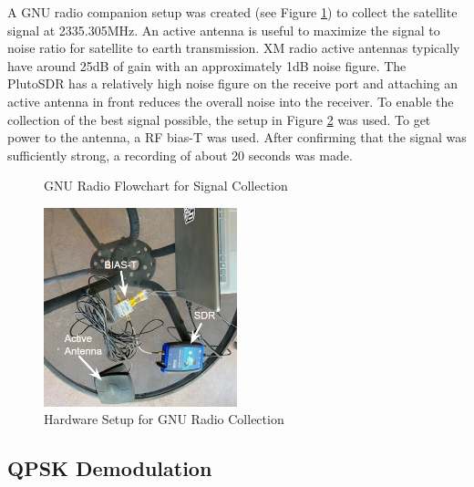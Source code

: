 \documentclass[conference,onecolumn]{IEEEtran}
\begin{document}
A GNU radio companion setup was created (see Figure \ref{fig::gnu_collect}) to collect the satellite signal at 2335.305MHz.  An active antenna is useful to maximize the signal to noise ratio for satellite to earth transmission.  XM radio active antennas typically have around 25dB of gain with an approximately 1dB  noise figure.  The PlutoSDR has a relatively high noise figure on the receive port and attaching an active antenna in front reduces the overall noise into the receiver.  To enable the collection of the best signal possible, the setup in Figure \ref{fig::gnu_hardware} was used.  To get power to the antenna, a RF bias-T was used.  After confirming that the signal was sufficiently strong, a recording of about 20 seconds was made.
\begin{figure}[H]
	\centerline{}
	\caption{GNU Radio Flowchart for Signal Collection}
	\label{fig::gnu_collect}
\end{figure}
\begin{figure}[H]
	\centerline{\includegraphics[width=0.5\textwidth]{capture_setup.png}}
	\caption{Hardware Setup for GNU Radio Collection}
	\label{fig::gnu_hardware}
\end{figure}


\subsection{QPSK Demodulation}
\end{document}
